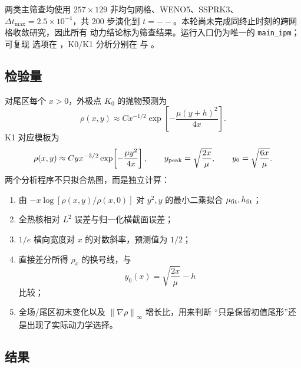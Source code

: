 \documentclass[11pt,a4paper,fontset=fandol]{ctexart}
\newcommand{\grad}{\nabla}
\newcommand{\norm}[1]{\left\lVert #1\right\rVert}
\newcommand{\NumFinalTime}{--}
\begin{document}
两类主筛查均使用 $257\times129$ 非均匀网格、WENO5、SSPRK3、
$\Delta t_{\max}=2.5\times10^{-4}$，共 200 步演化到
$t=\NumFinalTime$。本轮尚未完成同终止时刻的跨网格收敛研究，因此所有
动力结论标为筛查结果。运行入口仍为唯一的 \texttt{main\_ipm}；可复现
选项在 ，K0/K1 分析分别在
 与
。

\subsection{检验量}

对尾区每个 $x>0$，外极点 $K_0$ 的抛物预测为
\begin{equation}
  \rho(x,y)\approx Cx^{-1/2}
  \exp\!\left[-\frac{\mu(y+h)^2}{4x}\right].
  \label{eq:numerical-kernel}
\end{equation}
K1 对应模板为
\begin{equation}
  \rho(x,y)\approx C yx^{-3/2}
  \exp\!\left[-\frac{\mu y^2}{4x}\right],
  \qquad
  y_{\rm peak}=\sqrt{\frac{2x}{\mu}},
  \qquad
  y_0=\sqrt{\frac{6x}{\mu}}.
\end{equation}
两个分析程序不只拟合热图，而是独立计算：
\begin{enumerate}
  \item 由 $-x\log[\rho(x,y)/\rho(x,0)]$ 对 $y^2,y$ 的最小二乘拟合
  $\mu_{\rm fit},h_{\rm fit}$；
  \item 全热核相对 $L^2$ 误差与归一化横截面误差；
  \item $1/e$ 横向宽度对 $x$ 的对数斜率，预测值为 $1/2$；
  \item 直接差分所得 $\rho_x$ 的换号线，与
  \begin{equation}
    y_0(x)=\sqrt{\frac{2x}{\mu}}-h
  \end{equation}
  比较；
  \item 全场/尾区初末变化以及 $\norm{\grad\rho}_\infty$ 增长比，用来判断
  “只是保留初值尾形”还是出现了实际动力学选择。
\end{enumerate}

\subsection{结果}
\end{document}
